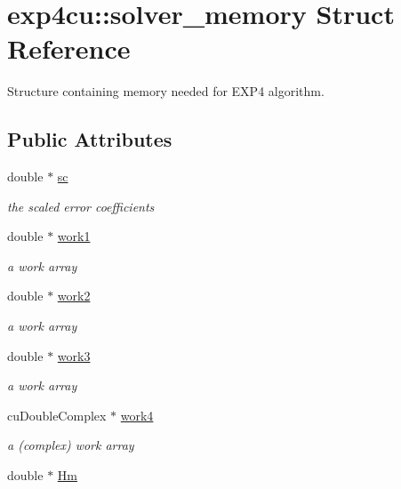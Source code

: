 \hypertarget{structexp4cu_1_1solver__memory}{}\section{exp4cu\+:\+:solver\+\_\+memory Struct Reference}
\label{structexp4cu_1_1solver__memory}


Structure containing memory needed for E\+X\+P4 algorithm.  


\subsection*{Public Attributes}
\begin{DoxyCompactItemize}
\item 
double $\ast$ \hyperlink{structexp4cu_1_1solver__memory_afb9f6a3602a177e7283a45afade87695}{sc}
\begin{DoxyCompactList}\small\item\em the scaled error coefficients \end{DoxyCompactList}\item 
double $\ast$ \hyperlink{structexp4cu_1_1solver__memory_aecfb53728ed87d6857212dd1e19345a8}{work1}
\begin{DoxyCompactList}\small\item\em a work array \end{DoxyCompactList}\item 
double $\ast$ \hyperlink{structexp4cu_1_1solver__memory_a571d5da694382eb078504242f69c4b78}{work2}
\begin{DoxyCompactList}\small\item\em a work array \end{DoxyCompactList}\item 
double $\ast$ \hyperlink{structexp4cu_1_1solver__memory_a1798b2513a1d21e9beaa998f1dc1df89}{work3}
\begin{DoxyCompactList}\small\item\em a work array \end{DoxyCompactList}\item 
cu\+Double\+Complex $\ast$ \hyperlink{structexp4cu_1_1solver__memory_a8b2943ea29259b541a9143409bc8317d}{work4}
\begin{DoxyCompactList}\small\item\em a (complex) work array \end{DoxyCompactList}\item 
double $\ast$ \hyperlink{structexp4cu_1_1solver__memory_aed9282a748435b4cc9e230bd92b9b91f}{Hm}

\end{DoxyCompactItemize}
